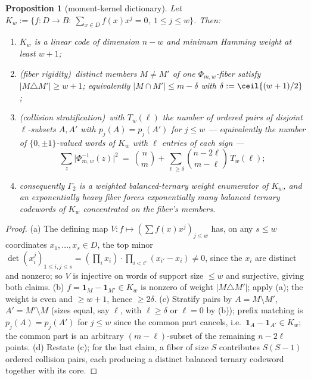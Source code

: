 \documentclass[11pt]{article}
\newtheorem{proposition}[proposition]{Proposition}
\theoremstyle{definition}
\theoremstyle{remark}
\newcommand{\B}{B}
\begin{document}
\begin{proposition}[moment-kernel dictionary]\label{prop:capfp-kernel}
Let $K_w:=\{f:D\to\B:\ \sum_{x\in D}f(x)x^j=0,\ 1\le j\le w\}$.  Then:
\begin{enumerate}[label=\textup{(\alph*)}]
\item $K_w$ is a linear code of dimension $n-w$ and minimum Hamming weight at least $w+1$;
\item \textup(fiber rigidity\textup)\ distinct members $M\ne M'$ of one $\Phi_{m,w}$-fiber satisfy $|M\triangle M'|\ge w+1$; equivalently $|M\cap M'|\le m-\delta$ with $\delta:=\ceil{(w+1)/2}$;
\item \textup(collision stratification\textup)\ with $T_w(\ell)$ the number of ordered pairs of disjoint $\ell$-subsets $A,A'$ with $p_j(A)=p_j(A')$ for $j\le w$ --- equivalently the number of $\{0,\pm1\}$-valued words of $K_w$ with $\ell$ entries of each sign ---
\[
        \sum_z\bigl|\Phi_{m,w}^{-1}(z)\bigr|^2
        \ =\ \binom nm+\sum_{\ell\ge\delta}\binom{n-2\ell}{m-\ell}\,T_w(\ell);
\]
\item consequently $\Gamma_2$ is a weighted balanced-ternary weight enumerator of $K_w$, and an exponentially heavy fiber forces exponentially many balanced ternary codewords of $K_w$ concentrated on the fiber's members.
\end{enumerate}
\end{proposition}

\begin{proof}
\textup{(a)}  The defining map $V:f\mapsto(\sum f(x)x^j)_{j\le w}$ has, on any $s\le w$ coordinates $x_1,\ldots,x_s\in D$, the top minor $\det(x_i^j)_{1\le i,j\le s}=(\prod_ix_i)\cdot\prod_{i<i'}(x_{i'}-x_i)\ne0$, since the $x_i$ are distinct and nonzero; so $V$ is injective on words of support size $\le w$ and surjective, giving both claims.
\textup{(b)}  $f=\mathbf1_{M}-\mathbf1_{M'}\in K_w$ is nonzero of weight $|M\triangle M'|$; apply \textup{(a)}; the weight is even and $\ge w+1$, hence $\ge2\delta$.
\textup{(c)}  Stratify pairs by $A=M\setminus M'$, $A'=M'\setminus M$ \textup(sizes equal, say $\ell$, with $\ell\ge\delta$ or $\ell=0$ by \textup{(b)}\textup); prefix matching is $p_j(A)=p_j(A')$ for $j\le w$ since the common part cancels, i.e.\ $\mathbf1_A-\mathbf1_{A'}\in K_w$; the common part is an arbitrary $(m-\ell)$-subset of the remaining $n-2\ell$ points.
\textup{(d)}  Restate \textup{(c)}; for the last claim, a fiber of size $S$ contributes $S(S-1)$ ordered collision pairs, each producing a distinct balanced ternary codeword together with its core.
\end{proof}
\end{document}
